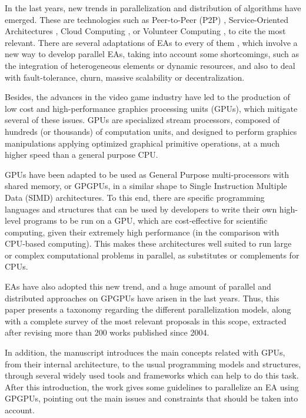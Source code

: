 \documentclass{article}
\begin{document}
In the last years, new trends in parallelization and
distribution of algorithms have emerged. These are technologies such as Peer-to-Peer (P2P) \cite{P2P-wikipedia}, Service-Oriented Architectures \cite{SOA-wikipedia}, Cloud Computing \cite{CloudComputing-wikipedia}, or Volunteer Computing \cite{VolunteerComputing-wikipedia}, to cite the most relevant. There are several adaptations of EAs to every of them \cite{laredo2010evag,SOA-Garcia-SanchezGCAG13,Meri_CloudEA13,Volunteer-LaredoBGVAGF14}, 
which involve a new way to develop parallel EAs, taking into account some shortcomings, such as the integration of heterogeneous elements or dynamic resources, and also to deal with fault-tolerance, churn, massive
scalability or decentralization.

Besides, the advances in the video game industry have led to the production of low cost and high-performance graphics processing units (GPUs), which mitigate several of these issues. 
GPUs are specialized stream processors, composed of hundreds (or
thousands) of computation units, and designed to perform graphics
manipulations applying optimized graphical primitive operations, at a
much higher speed than a general purpose CPU. 

GPUs have been adapted to be used as General Purpose multi-processors
with shared memory, or GPGPUs, in a similar shape to Single
Instruction Multiple Data (SIMD)\cite{SIMD-wikipedia} architectures. 
To this end, there are specific programming languages and structures that can be used by developers to write their own high-level programs to be run on a GPU, which are cost-effective for scientific computing, given their extremely high performance (in the comparison with CPU-based computing). 
This makes these architectures well suited to run large or complex computational problems in parallel, as substitutes or complements for CPUs.

EAs have also adopted this new trend, and a huge amount of parallel and distributed approaches on GPGPUs have arisen in the last years.
Thus, this paper presents a taxonomy regarding the different
parallelization models, along with a complete survey of the most
relevant proposals in this scope, extracted after revising more than
200 works published since 2004. 

In addition, the manuscript introduces the main concepts related with
GPUs, from their internal architecture, to the usual programming
models and structures, through several widely used tools and
frameworks which can help to do this task. After this introduction, the work gives some guidelines to parallelize an EA using GPGPUs, pointing out the main issues and constraints that should be taken into account. 
\end{document}
